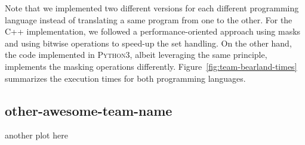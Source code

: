 \documentclass[11pt]{amsart}
\begin{document}
Note that we implemented two different versions for each different programming language instead of translating a same program from one to the other.
For the \textsc{C++} implementation, we followed a performance-oriented approach using masks and using bitwise operations to speed-up the set handling.
On the other hand, the code implemented in \textsc{Python3}, albeit leveraging the same principle, implements the masking operations differently. 
Figure~\ref{fig:team-bearland-times} summarizes the execution times for both programming languages.

\subsection{other-awesome-team-name}

another plot here
\end{document}

